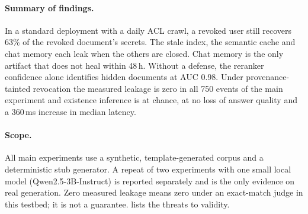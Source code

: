 \paragraph{Summary of findings.}
In a standard deployment with a daily ACL crawl, a revoked user still recovers 63\% of the revoked document's secrets. The stale index, the semantic cache and chat memory each leak when the others are closed. Chat memory is the only artifact that does not heal within 48\,h. Without a defense, the reranker confidence alone identifies hidden documents at AUC 0.98. Under provenance-tainted revocation the measured leakage is zero in all 750 events of the main experiment and existence inference is at chance, at no loss of answer quality and a 360\,ms increase in median latency.

\paragraph{Scope.}
All main experiments use a synthetic, template-generated corpus and a deterministic stub generator. A repeat of two experiments with one small local model (Qwen2.5-3B-Instruct) is reported separately and is the only evidence on real generation. Zero measured leakage means zero under an exact-match judge in this testbed; it is not a guarantee.  lists the threats to validity.
